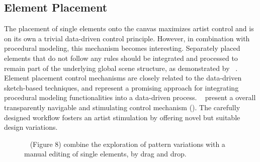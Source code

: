 \subsection{Element Placement}
\label{subsubsec:analysis_creative_means_elements}

The placement of single elements onto the canvas maximizes artist control and is on its own a trivial data-driven control principle. However, in combination with procedural modeling, this mechanism becomes interesting. Separately placed elements that do not follow any rules should be integrated and processed to remain part of the underlying global scene structure, as demonstrated by \citeauthor*{gieseke_2017_ooo}~\cite{gieseke_2017_ooo}.
Element placement control mechanisms are closely related to the data-driven sketch-based techniques, and represent a promising approach for integrating procedural modeling functionalities into a data-driven process. \citeauthor*{guerrero_2016_pep}~\cite{guerrero_2016_pep} present a overall transparently navigable and stimulating control mechanism (). The carefully designed workflow fosters an artist stimulation by offering novel but suitable design variations.

\begin{figure}[H]
    \centering
    \caption{\label{fig:guerrero_2016_pep}\citeauthor*{guerrero_2016_pep}~\cite{guerrero_2016_pep} (Figure 8) combine the exploration of pattern variations with a manual editing of single elements, \eg by drag and drop.}
\end{figure}
